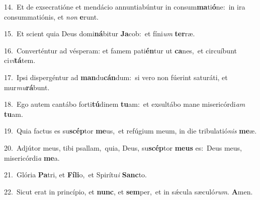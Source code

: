 {\numbfont\textcolor{\numbcolor}{14.}}~Et de exsecratióne et mendácio annuntiabúntur in consum\-\textbf{ma}\-ti\-\textbf{ó}\-ne:~\star in ira consummatiónis, et \textit{non} \textbf{e}\-runt.\par
{\numbfont\textcolor{\numbcolor}{15.}}~Et scient quia Deus domi\-\textbf{ná}\-bitur \textbf{Ja}\-cob:~\star et fíni\textit{um} \textbf{ter}\-ræ.\par
{\numbfont\textcolor{\numbcolor}{16.}}~Converténtur ad vésperam: et famem pati\-\textbf{én}\-tur ut \textbf{ca}\-nes,~\star et circuíbunt ci\-\textit{vi}\-\textbf{tá}tem.\par
{\numbfont\textcolor{\numbcolor}{17.}}~Ipsi dispergéntur ad \textbf{man}\-du\-\textbf{cán}\-dum:~\star si vero non fúerint saturáti, et mur\-\textit{mu}\-\textbf{rá}bunt.\par
{\numbfont\textcolor{\numbcolor}{18.}}~Ego autem cantábo forti\-\textbf{tú}\-dinem \textbf{tu}\-am:~\star et exsultábo mane misericórdi\textit{am} \textbf{tu}\-am.\par
{\numbfont\textcolor{\numbcolor}{19.}}~Quia factus es su\-\textbf{scép}\-tor \textbf{me}\-us,~\star et refúgium meum, in die tribulatió\textit{nis} \textbf{me}\-æ.\par
{\numbfont\textcolor{\numbcolor}{20.}}~Adjútor meus, tibi psallam,~\dagger quia, Deus, su\-\textbf{scép}\-tor \textbf{me}\-\textbf{us} es:~\star Deus meus, misericórdi\textit{a} \textbf{me}\-a.\par
{\numbfont\textcolor{\numbcolor}{21.}}~Glória \textbf{Pa}\-tri, et \textbf{Fí}\-\textbf{li}o,~\star et Spirítu\textit{i} \textbf{Sanc}\-to.\par
{\numbfont\textcolor{\numbcolor}{22.}}~Sicut erat in princípio, et \textbf{nunc}\-, et \textbf{sem}\-per,~\star et in sǽcula sæculó\-\textit{rum}\-. \textbf{A}\-men.\par
